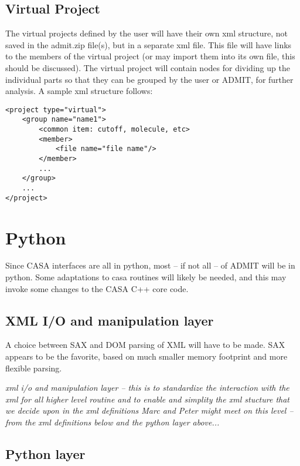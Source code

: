 \documentclass{article}
\begin{document}
\subsection{Virtual Project}

The virtual projects defined by the user will have their own xml
structure, not saved in the admit.zip file(s), but in a separate xml
file. This file will have links to the members of the virtual project
(or may import them into its own file, this should be discussed). The
virtual project will contain nodes for dividing up the individual
parts so that they can be grouped by the user or ADMIT, for further
analysis. A sample xml structure follows:


\begin{verbatim}
<project type="virtual">
    <group name="name1">
    	<common item: cutoff, molecule, etc>
    	<member>
    		<file name="file name"/>
    	</member>
    	...
    </group>
    ...
</project>
\end{verbatim}


\section{Python}

Since CASA interfaces are all in python, most -- if not all -- of
ADMIT will be in python. Some adaptations to casa routines will
likely be needed, and this may invoke some changes to the CASA
C++ core code.

\subsection{XML I/O and manipulation layer}

A choice between SAX and DOM parsing of XML will have to be made.
SAX appears to be the favorite, based on much smaller memory
footprint and more flexible parsing.




{\it xml i/o and manipulation layer -- this is to standardize
the interaction with the xml for all higher level
routine and to enable and simplity the xml stucture
that we decide upon in the xml definitions
Marc and Peter might meet on this level -- from the
xml definitions below and the python layer above...}



\subsection{Python layer}
\end{document}
